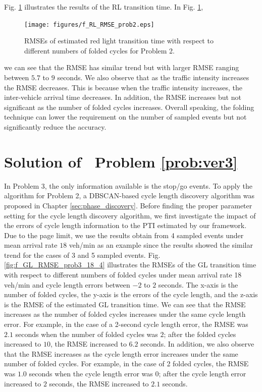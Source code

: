 \documentclass[final,oneside,onecolumn,12pt,a4paper]{book}%
\begin{document}
Fig. \ref{fig:f_RL_RMSE_prob2} illustrates the results of the RL transition
time. In Fig. \ref{fig:f_RL_RMSE_prob2},\begin{figure}[th]
\centerline{\texttt{[image: figures/f\_RL\_RMSE\_prob2.eps]}} \hfill\caption{RMSEs of estimated red light
transition time with respect to different numbers of folded cycles for Problem
2.}%
\label{fig:f_RL_RMSE_prob2}%
\end{figure}we can see that the RMSE has similar trend but with larger RMSE
ranging between $5.7$ to $9$ seconds. We also observe that as the traffic
intensity increases the RMSE decreases. This is because when the traffic
intensity increases, the inter-vehicle arrival time decreases. In addition,
the RMSE increases but not significant as the number of folded cycles
increases. Overall speaking, the folding technique can lower the requirement
on the number of sampled events but not significantly reduce the accuracy.

\section{Solution of \ Problem \ref{prob:ver3}}

In Problem 3, the only information available is the stop/go events. To apply
the algorithm for Problem 2, a DBSCAN-based cycle length discovery algorithm
was proposed in Chapter \ref{sec:phase_discovery}. Before finding the proper
parameter setting for the cycle length discovery algorithm, we first
investigate the impact of the errors of cycle length information to the PTI
estimated by our framework. Due to the page limit, we use the results obtain
from 4 sampled events under mean arrival rate $18$ veh/min as an example since
the results showed the similar trend for the cases of 3 and 5 sampled events.
Fig. \ref{fig:f_GL_RMSE_prob3_18_4} illustrates the RMSEs of the GL transition
time with respect to different numbers of folded cycles under mean arrival
rate 18 veh/min and cycle length errors between $-2$ to $2$ seconds. The
x-axis is the number of folded cycles, the y-axis is the errors of the cycle
length, and the z-axis is the RMSE of the estimated GL transition time. We can
see that the RMSE increases as the number of folded cycles increases under the
same cycle length error. For example, in the case of a 2-second cycle length
error, the RMSE was $2.1$ seconds when the number of folded cycles was $2$;
after the folded cycles increased to $10$, the RMSE increased to $6.2$
seconds. In addition, we also observe that the RMSE increases as the cycle
length error increases under the same number of folded cycles. For example, in
the case of 2 folded cycles, the RMSE was $1.0$ seconds when the cycle length
error was $0$; after the cycle length error increased to $2$ seconds, the RMSE
increased to $2.1$ seconds.
\end{document}
